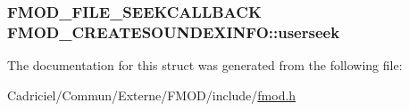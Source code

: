\hypertarget{struct_f_m_o_d___c_r_e_a_t_e_s_o_u_n_d_e_x_i_n_f_o_a9063a97ac9de132f8ff2ba7048670e1c}{
\subsubsection[{userseek}]{\setlength{\rightskip}{0pt plus 5cm}F\-M\-O\-D\-\_\-\-F\-I\-L\-E\-\_\-\-S\-E\-E\-K\-C\-A\-L\-L\-B\-A\-C\-K F\-M\-O\-D\-\_\-\-C\-R\-E\-A\-T\-E\-S\-O\-U\-N\-D\-E\-X\-I\-N\-F\-O\-::userseek}}\label{struct_f_m_o_d___c_r_e_a_t_e_s_o_u_n_d_e_x_i_n_f_o_a9063a97ac9de132f8ff2ba7048670e1c}


The documentation for this struct was generated from the following file\-:\begin{DoxyCompactItemize}
\item 
Cadriciel/\-Commun/\-Externe/\-F\-M\-O\-D/include/\hyperlink{fmod_8h}{fmod.\-h}\end{DoxyCompactItemize}
